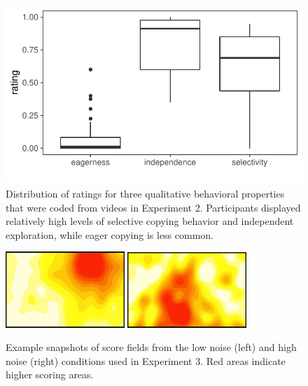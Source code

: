 \documentclass[12pt,letterpaper]{article}
\begin{document}
\begin{figure}[t!]
    \centering
    \includegraphics[width=0.9\linewidth]{figures/coding.pdf}
    \caption{Distribution of ratings for three qualitative behavioral properties that were coded from videos in Experiment 2. Participants displayed relatively high levels of selective copying behavior and independent exploration, while eager copying is less common.}
    \label{fig:selective}
\end{figure}


\begin{figure}[b!]
  \centering
  \includegraphics[width=0.4\textwidth]{./figures/easy-field}
  \hspace{0.1cm}
  \includegraphics[width=0.4\textwidth]{./figures/medium-field}
  \caption{Example snapshots of score fields from the low noise (left) and high noise (right) conditions used in Experiment 3.  Red areas indicate higher scoring areas.}
  \label{fig:score_exp3}
\end{figure}
\end{document}
